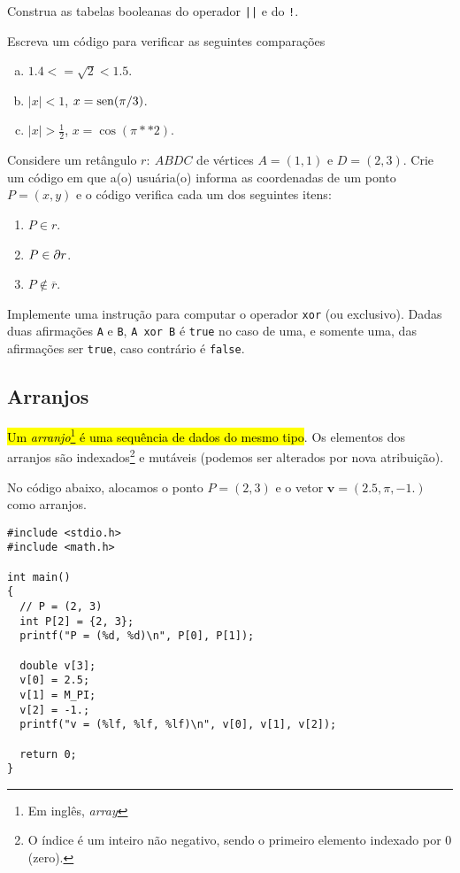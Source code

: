 \documentclass[12pt]{article}
\begin{document}
\begin{exr}
  Construa as tabelas booleanas do operador \lstinline+||+ e do \lstinline+!+.
\end{exr}

\begin{exr}
  Escreva um código para verificar as seguintes comparações
  \begin{enumerate}[a)]
  \item $1.4 <= \sqrt{2} < 1.5$.
  \item $|x| < 1$, $x = \operatorname{sen}(\pi/3)$.
  \item $|x| > \frac{1}{2}$, $x = \cos(\pi**2)$.
  \end{enumerate}
\end{exr}

\begin{exr}
  Considere um retângulo $r: ~ABDC$ de vértices $A = (1, 1)$ e $D = (2, 3)$. Crie um código em que a(o) usuária(o) informa as coordenadas de um ponto $P = (x, y)$ e o código verifica cada um dos seguintes itens:
  \begin{enumerate}
  \item $P\in r$.
  \item $P\in \partial r$.
  \item $P\not\in \overline{r}$.
  \end{enumerate}
\end{exr}

\begin{exr}
  Implemente uma instrução para computar o operador \lstinline+xor+ (ou exclusivo). Dadas duas afirmações \lstinline+A+ e \lstinline+B+, \lstinline+A xor B+ é \lstinline+true+ no caso de uma, e somente uma, das afirmações ser \lstinline+true+, caso contrário é \lstinline+false+.
\end{exr}

\subsection{Arranjos}

\hl{Um \emph{arranjo}\footnote{Em inglês, \textit{array}} é uma sequência de dados do mesmo tipo}. Os elementos dos arranjos são indexados\footnote{O índice é um inteiro não negativo, sendo o primeiro elemento indexado por $0$ (zero).} e mutáveis (podemos ser alterados por nova atribuição).

\begin{ex}
  No código abaixo, alocamos o ponto $P = (2, 3)$ e o vetor $\pmb{v} = (2.5, \pi, -1.)$ como arranjos.
\begin{lstlisting}
#include <stdio.h>
#include <math.h>

int main()
{
  // P = (2, 3)
  int P[2] = {2, 3};
  printf("P = (%d, %d)\n", P[0], P[1]);
  
  double v[3];
  v[0] = 2.5;
  v[1] = M_PI;
  v[2] = -1.;
  printf("v = (%lf, %lf, %lf)\n", v[0], v[1], v[2]);
  
  return 0;
}
\end{lstlisting}
\end{ex}
\end{document}
